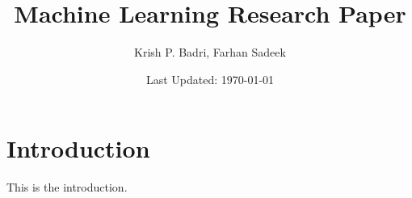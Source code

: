 \documentclass{article}
\title{Machine Learning Research Paper}
\author{Krish P. Badri, Farhan Sadeek}
\date{Last Updated: \today}
\begin{document}
\maketitle

\section{Introduction}
This is the introduction.
\end{document}
